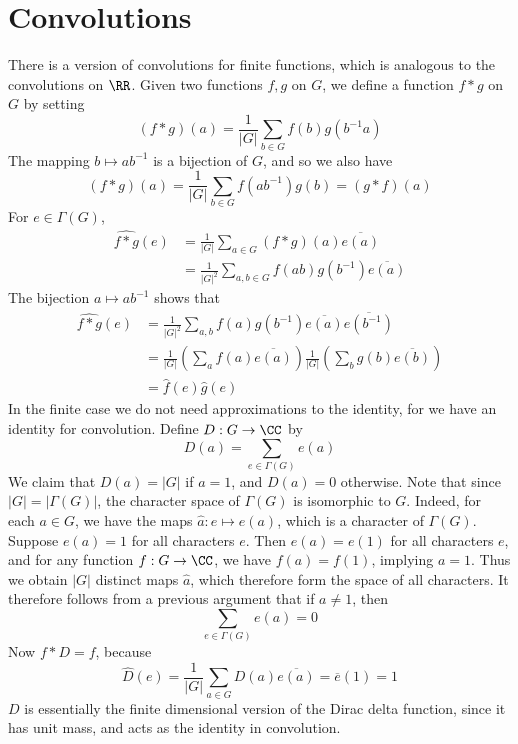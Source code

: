 \section{Convolutions}

There is a version of convolutions for finite functions, which is analogous to the convolutions on $\RR$. Given two functions $f,g$ on $G$, we define a function $f * g$ on $G$ by setting
%
\[ (f * g)(a) = \frac{1}{|G|} \sum_{b \in G} f(b) g(b^{-1} a) \]
%
The mapping $b \mapsto ab^{-1}$ is a bijection of $G$, and so we also have
%
\[ (f * g)(a) = \frac{1}{|G|} \sum_{b \in G} f(ab^{-1}) g(b) = (g * f)(a) \]
%
For $e \in \Gamma(G)$,
%
\begin{align*}
    \widehat{f * g}(e) &= \frac{1}{|G|} \sum_{a \in G} (f*g)(a) \overline{e(a)}\\
    &= \frac{1}{|G|^2} \sum_{a,b \in G} f(ab) g(b^{-1}) \overline{e(a)}
\end{align*}
%
The bijection $a \mapsto ab^{-1}$ shows that
%
\begin{align*}
    \widehat{f*g}(e) &= \frac{1}{|G|^2} \sum_{a,b} f(a) g(b^{-1}) \overline{e(a)} \overline{e(b^{-1})}\\
    &= \frac{1}{|G|} \left( \sum_a f(a) \overline{e(a)} \right) \frac{1}{|G|} \left( \sum_b g(b) \overline{e(b)} \right)\\
    &= \widehat{f}(e) \widehat{g}(e)
\end{align*}
%
In the finite case we do not need approximations to the identity, for we have an identity for convolution. Define $D: G \to \CC$ by
%
\[ D(a) = \sum_{e \in \Gamma(G)} e(a) \]
%
We claim that $D(a) = |G|$ if $a = 1$, and $D(a) = 0$ otherwise. Note that since $|G| = |\Gamma(G)|$, the character space of $\Gamma(G)$ is isomorphic to $G$. Indeed, for each $a \in G$, we have the maps $\widehat{a}: e \mapsto e(a)$, which is a character of $\Gamma(G)$. Suppose $e(a) = 1$ for all characters $e$. Then $e(a) = e(1)$ for all characters $e$, and for any function $f: G \to \CC$, we have $f(a) = f(1)$, implying $a = 1$. Thus we obtain $|G|$ distinct maps $\widehat{a}$, which therefore form the space of all characters. It therefore follows from a previous argument that if $a \neq 1$, then
%
\[ \sum_{e \in \Gamma(G)} e(a) = 0 \]
%
Now $f * D = f$, because
%
\[ \widehat{D}(e) = \frac{1}{|G|} \sum_{a \in G} D(a) \overline{e(a)} = \overline{e}(1) = 1 \]
%
$D$ is essentially the finite dimensional version of the Dirac delta function, since it has unit mass, and acts as the identity in convolution.

